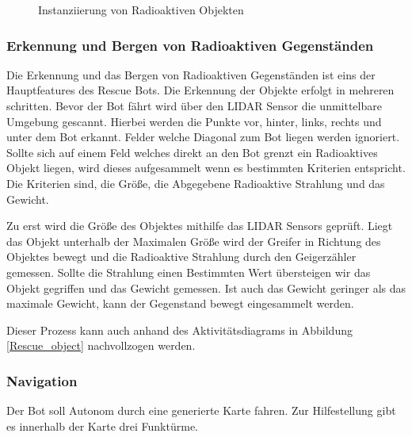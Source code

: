 \begin{figure}[H]
  \caption{Instanziierung von Radioaktiven Objekten}
  \label{rad}
\end{figure}

\subsubsection{Erkennung und Bergen von Radioaktiven Gegenständen}
\label{erk}
Die Erkennung und das Bergen von Radioaktiven Gegenständen ist eins der Hauptfeatures des Rescue Bots. Die Erkennung der Objekte erfolgt in mehreren schritten. Bevor der Bot fährt wird über den LIDAR Sensor die unmittelbare Umgebung gescannt. Hierbei werden die Punkte vor, hinter, links, rechts und unter dem Bot erkannt. Felder welche Diagonal zum Bot liegen werden ignoriert. Sollte sich auf einem Feld welches direkt an den Bot grenzt ein Radioaktives Objekt liegen, wird dieses aufgesammelt wenn es bestimmten Kriterien entspricht. Die Kriterien sind, die Größe, die Abgegebene Radioaktive Strahlung und das Gewicht. 

Zu erst wird die Größe des Objektes mithilfe das LIDAR Sensors geprüft. Liegt das Objekt unterhalb der Maximalen Größe wird der Greifer in Richtung des Objektes bewegt und die Radioaktive Strahlung durch den Geigerzähler gemessen. Sollte die Strahlung einen Bestimmten Wert übersteigen wir das Objekt gegriffen und das Gewicht gemessen. Ist auch das Gewicht geringer als das maximale Gewicht, kann der Gegenstand bewegt eingesammelt werden. 

Dieser Prozess kann auch anhand des Aktivitätsdiagrams in Abbildung \ref{Rescue_object} nachvollzogen werden.
\subsubsection{Navigation}
\label{nav}
Der Bot soll Autonom durch eine generierte Karte fahren. Zur Hilfestellung gibt es innerhalb der Karte drei Funktürme. 

